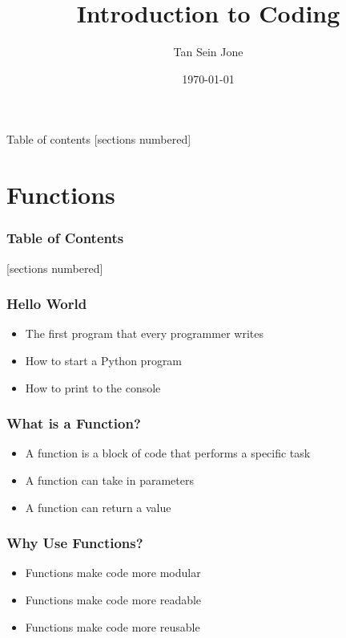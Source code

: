 \documentclass[serif, 9pt, aspectratio=32]{beamer}
\title{Introduction to Coding}
\date{\today}
\author{Tan Sein Jone}
\institute{University of British Columbia}
\begin{document}
\maketitle

\begin{frame}{Table of contents}
    [sections numbered]
    \tableofcontents[hideallsubsections]
\end{frame}

\section{Functions}

\begin{frame}
    \frametitle{Table of Contents}
    [sections numbered]
    \tableofcontents[currentsection]
\end{frame}

\begin{frame}
    \centering
    \frametitle{Hello World}
    \begin{itemize}
        \setlength{\itemsep}{3em}
        \item The first program that every programmer writes
        \item How to start a Python program
        \item How to print to the console
    \end{itemize}
\end{frame}

\begin{frame}
    \centering
    \frametitle{What is a Function?}
    \begin{itemize}
        \setlength{\itemsep}{3em}
        \item A function is a block of code that performs a specific task
        \item A function can take in parameters
        \item A function can return a value
    \end{itemize}
\end{frame}

\begin{frame}
    \centering
    \frametitle{Why Use Functions?}
    \begin{itemize}
        \setlength{\itemsep}{3em}
        \item Functions make code more modular
        \item Functions make code more readable
        \item Functions make code more reusable
    \end{itemize}
\end{frame}
\end{document}
